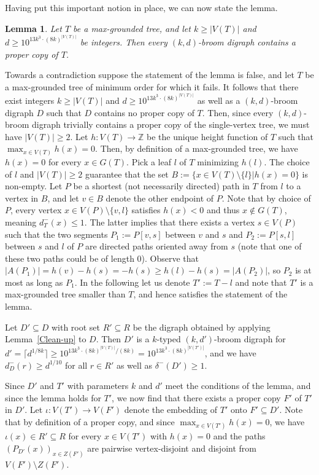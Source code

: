 \documentclass[a4paper,11pt]{article}
\makeatletter
\renewenvironment{proof}[1][\proofname] {\par\pushQED{\qed}\normalfont\topsep6\p@\@plus6\p@\relax\trivlist\item[\hskip\labelsep\bfseries#1\@addpunct{.}]\ignorespaces}{\popQED\endtrivlist\@endpefalse}
\newtheorem{lemma}[theorem]{\bf Lemma}
\theoremstyle{definition}
\makeatother
\begin{document}
Having put this important notion in place, we can now state the lemma.
\begin{lemma}\label{lem:keyfortheorem}
Let $T$ be a max-grounded tree, and let $k\ge |V(T)|$ and $d\ge 10^{13k^3\cdot (8k)^{|V(T)|}}$ be integers. Then every $(k,d)$-broom digraph contains a proper copy of $T$.
\end{lemma}
\begin{proof}
Towards a contradiction suppose the statement of the lemma is false, and let $T$ be a max-grounded tree of minimum order for which it fails. It follows that there exist integers $k\ge |V(T)|$ and $d\ge 10^{13k^3\cdot (8k)^{|V(T)|}}$ as well as a $(k,d)$-broom digraph $D$ such that $D$ contains no proper copy of $T$. Then, since every $(k,d)$-broom digraph trivially contains a proper copy of the single-vertex tree, we must have $|V(T)|\ge 2$. Let $h:V(T)\rightarrow \mathbb{Z}$ be the unique height function of $T$ such that $\max_{x\in V(T)}{h(x)}=0$. Then, by definition of a max-grounded tree, we have $h(x)=0$ for every $x\in G(T)$. Pick a leaf $l$ of $T$ minimizing $h(l)$. The choice of $l$ and $|V(T)|\ge 2$ guarantee that the set $B:=\{x\in V(T)\setminus \{l\}|h(x)=0\}$ is non-empty. Let $P$ be a shortest (not necessarily directed) path in $T$ from $l$ to a vertex in $B$, and let $v\in B$ denote the other endpoint of $P$. Note that by choice of $P$, every vertex $x\in V(P)\setminus \{v,l\}$ satisfies $h(x)<0$ and thus $x\notin G(T)$, meaning $d_T^{-}(x)\le 1$. The latter implies that there exists a vertex $s\in V(P)$ such that the two segments $P_1:=P[v,s]$ between $v$ and $s$ and $P_2:=P[s,l]$ between $s$ and $l$ of $P$ are directed paths oriented away from $s$ (note that one of these two paths could be of length $0$). Observe that $|A(P_1)|=h(v)-h(s)=-h(s)\ge h(l)-h(s)=|A(P_2)|$, so $P_2$ is at most as long as $P_1$. In the following let us denote $T':=T-l$ and note that $T'$ is a max-grounded tree smaller than $T$, and hence satisfies the statement of the lemma.

Let $D'\subseteq D$ with root set $R'\subseteq R$ be the digraph obtained by applying Lemma~\ref{Clean-up} to $D$. Then $D'$ is a $k$-typed $(k,d')$-broom digraph for $d'=\lceil d^{1/8k}\rceil \ge 10^{13k^3\cdot (8k)^{|V(T)|}/(8k)}=10^{13k^3\cdot (8k)^{|V(T')|}}$, and we have $d_D^-(r)\ge d^{1/10}$ for all $r\in R'$ as well as $\delta^-(D')\ge 1$.

Since $D'$ and $T'$ with parameters $k$ and $d'$ meet the conditions of the lemma, and since the lemma holds for $T'$, we now find that there exists a proper copy $F'$ of $T'$ in $D'$. Let $\iota:V(T')\rightarrow V(F')$ denote the embedding of $T'$ onto $F'\subseteq D'$. Note that by definition of a proper copy, and since $\max_{x\in V(T')}{h(x)}=0$, we have $\iota(x)\in R'\subseteq R$ for every $x\in V(T')$ with $h(x)=0$ and the paths $(P_{D'}(x))_{x\in Z(F')}$ are pairwise vertex-disjoint and disjoint from $V(F')\setminus Z(F')$.


\end{proof}
\end{document}
